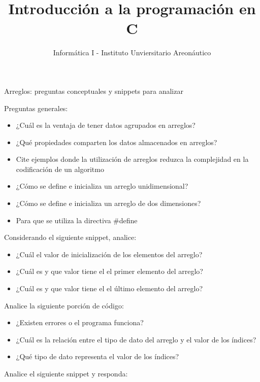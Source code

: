 \documentclass[xcolor=pdftex,table,11pt]{beamer}
\author{Informática I - Instituto Unviersitario Areonáutico}
\title{Introducción a la programación en C}
\begin{document}
\begin{frame}[allowframebreaks]{Arreglos: preguntas conceptuales y snippets para analizar}


Preguntas generales:


\begin{itemize}
\item ¿Cuál es la ventaja de tener datos agrupados en arreglos?
\item ¿Qué propiedades comparten los datos almacenados en arreglos?
\item Cite ejemplos donde la utilización de arreglos reduzca la complejidad en la codificación de un algoritmo
\item ¿Cómo se define e inicializa un arreglo unidimensional?
\item ¿Cómo se define e inicializa un arreglo de dos dimensiones?
\item Para que se utiliza la directiva \#define
\end{itemize}
\newpage


Considerando el siguiente snippet, analice:
\codesetstylefrombeamer
{}


\begin{itemize}

\item ¿Cuál el valor de inicialización de los elementos del arreglo?
\item ¿Cuál es y que valor tiene el el primer elemento del arreglo?
\item ¿Cuál es y que valor tiene el el último elemento del arreglo?

\end{itemize}

\newpage
Analice la siguiente porción de código:

\codesetstylefrombeamer
{}


\begin{itemize}

\item ¿Existen errores o el programa funciona?
\item ¿Cuál es la relación entre el tipo de dato del arreglo y el valor de los índices?
\item ¿Qué tipo de dato representa el valor de los índices?

\end{itemize}


\newpage

Analice el siguiente snippet y responda:


\end{frame}
\end{document}
